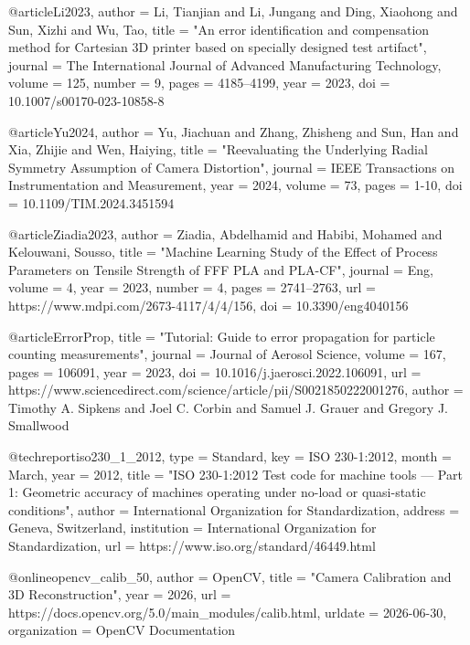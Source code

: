 {{{{@article{Li2023,
	author    = {Li, Tianjian and Li, Jungang and Ding, Xiaohong and Sun, Xizhi and Wu, Tao},
	title     = "{An error identification and compensation method for Cartesian 3D printer based on specially designed test artifact}",
	journal   = {The International Journal of Advanced Manufacturing Technology},
	volume    = {125},
	number    = {9},
	pages     = {4185--4199},
	year      = {2023},
	doi       = {10.1007/s00170-023-10858-8}
}

@article{Yu2024,
	author    = {Yu, Jiachuan and Zhang, Zhisheng and Sun, Han and Xia, Zhijie and Wen, Haiying},
	title     = "{Reevaluating the Underlying Radial Symmetry Assumption of Camera Distortion}",
	journal   = {IEEE Transactions on Instrumentation and Measurement}, 
	year      = {2024},
	volume    = {73},
	pages     = {1-10},
	doi       = {10.1109/TIM.2024.3451594}
}

@article{Ziadia2023,
	author    = {Ziadia, Abdelhamid and Habibi, Mohamed and Kelouwani, Sousso},
	title     = "{Machine Learning Study of the Effect of Process Parameters on Tensile Strength of FFF PLA and PLA-CF}",
	journal   = {Eng},
	volume    = {4},
	year      = {2023},
	number    = {4},
	pages     = {2741--2763},
	url       = {https://www.mdpi.com/2673-4117/4/4/156},
	doi       = {10.3390/eng4040156}
}

@article{ErrorProp,
	title     = "{Tutorial: Guide to error propagation for particle counting measurements}",
	journal   = {Journal of Aerosol Science},
	volume    = {167},
	pages     = {106091},
	year      = {2023},
	doi       = {10.1016/j.jaerosci.2022.106091},
	url       = {https://www.sciencedirect.com/science/article/pii/S0021850222001276},
	author    = {Timothy A. Sipkens and Joel C. Corbin and Samuel J. Grauer and Gregory J. Smallwood}
}

@techreport{iso230_1_2012,
	type        = {Standard},
	key         = {ISO 230-1:2012},
	month       = {March},
	year        = {2012},
	title       = "{ISO 230-1:2012 Test code for machine tools --- Part 1: Geometric accuracy of machines operating under no-load or quasi-static conditions}",
	author      = {{International Organization for Standardization}},
	address     = {Geneva, Switzerland},
	institution = {International Organization for Standardization},
	url         = {https://www.iso.org/standard/46449.html}
}

@online{opencv_calib_50,
	author       = {{OpenCV}},
	title        = "{Camera Calibration and 3D Reconstruction}",
	year         = {2026},
	url          = {https://docs.opencv.org/5.0/main_modules/calib.html},
	urldate      = {2026-06-30},
	organization = {OpenCV Documentation}
}

}}}}

